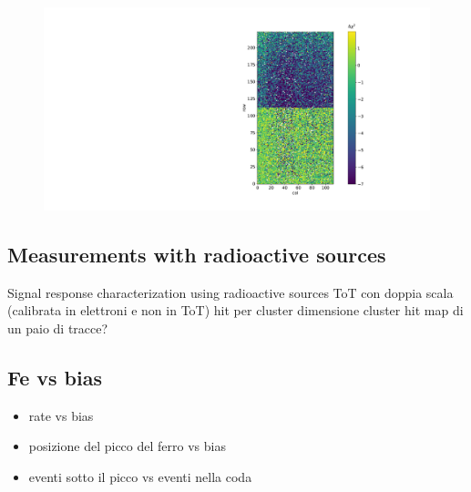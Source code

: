         \begin{figure}[h!]
            \centering
            \includegraphics[width=.90\linewidth]{figures/charaterization/deltachi2_Fe.pdf}
            \caption{}
            \label{fig:chi2_map}
        \end{figure}            

        
    
     
     
     \subsection{Measurements with radioactive sources}
        Signal response characterization using radioactive sources 
        ToT con doppia scala (calibrata in elettroni e non in ToT)
         hit per cluster
         dimensione cluster
         hit map di un paio di tracce?

    \subsection{Fe vs bias}
         \begin{itemize}
             \item rate vs bias 
             \item posizione del picco del ferro vs bias    
             \item eventi sotto il picco vs eventi nella coda
         \end{itemize} 
         
